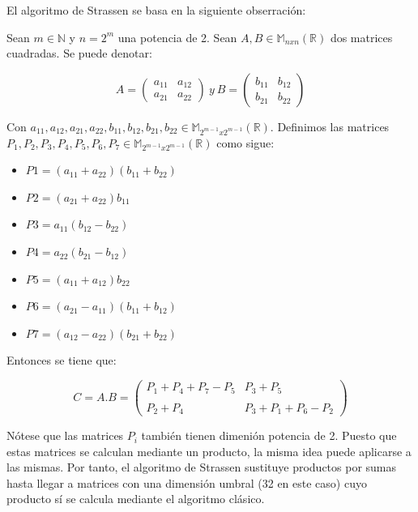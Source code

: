 \documentclass[]{article}
\begin{document}
El algoritmo de Strassen se basa en la siguiente obserración:

Sean \(m \in \mathbb{N}\) y \(n = 2^m\) una potencia de 2. Sean
\(A,B \in \mathbb{M}_{nxn}(\mathbb{R})\) dos matrices cuadradas. Se
puede denotar:

\[ A = \left( \begin{array}{ccc}
a_{11} & a_{12} \\
a_{21} & a_{22} \end{array} \right) \ y
\ B = \left( \begin{array}{ccc}
b_{11} & b_{12} \\
b_{21} & b_{22} \end{array} \right)\]

Con
\(a_{11}, a_{12}, a_{21}, a_{22}, b_{11}, b_{12}, b_{21}, b_{22} \in \mathbb{M}_{2^{m-1}x2^{m-1}}(\mathbb{R})\).
Definimos las matrices
\(P_{1}, P_{2}, P_{3}, P_{4}, P_{5}, P_{6}, P_{7} \in \mathbb{M}_{2^{m-1}x2^{m-1}}(\mathbb{R})\)
como sigue:

\begin{itemize}
\itemsep1pt\parskip0pt
\item
  \(P1 = (a_{11} + a_{22})(b_{11} + b_{22})\)\\
\item
  \(P2 = (a_{21} + a_{22})b_{11}\)\\
\item
  \(P3 = a_{11}(b_{12} - b_{22})\)\\
\item
  \(P4 = a_{22}(b_{21} - b_{12})\)\\
\item
  \(P5 = (a_{11} + a_{12})b_{22}\)\\
\item
  \(P6 = (a_{21} - a_{11})(b_{11} + b_{12})\)\\
\item
  \(P7 = (a_{12} - a_{22})(b_{21} + b_{22})\)
\end{itemize}

Entonces se tiene que:

\[ C = A.B = \left( \begin{array}{ccc}
P_1+P_4+P_7-P_5 & P_3 + P_5 \\
\\
P_2 + P_4 & P_3 + P_1 + P_6 - P_2 \end{array} \right)\]

Nótese que las matrices \(P_i\) también tienen dimenión potencia de 2.
Puesto que estas matrices se calculan mediante un producto, la misma
idea puede aplicarse a las mismas. Por tanto, el algoritmo de Strassen
sustituye productos por sumas hasta llegar a matrices con una dimensión
umbral (32 en este caso) cuyo producto sí se calcula mediante el
algoritmo clásico.
\end{document}
